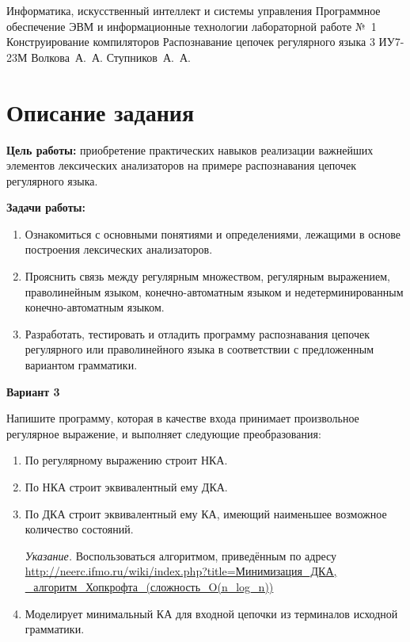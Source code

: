 \documentclass{bmstu-gost-7-32}
\begin{document}
\makereporttitle
	{Информатика, искусственный интеллект и системы управления} %
	{Программное обеспечение ЭВМ и информационные технологии} %
	{лабораторной работе №~1} %
	{Конструирование компиляторов} %
	{Распознавание цепочек регулярного языка} %
	{3} %
	{ИУ7-23М} %
	{Волкова~А.~А.} %
	{Ступников~А.~А.} %

\section*{Описание задания}

\textbf{Цель работы:} приобретение практических навыков реализации важнейших элементов лексических анализаторов на примере распознавания цепочек регулярного языка.

\textbf{Задачи работы:}
\begin{enumerate}
	\item Ознакомиться с основными понятиями и определениями, лежащими в основе построения лексических анализаторов.
	\item Прояснить связь между регулярным множеством, регулярным выражением, праволинейным языком, конечно-автоматным языком и недетерминированным конечно-автоматным языком.
	\item Разработать, тестировать и отладить программу распознавания цепочек регулярного или праволинейного языка в соответствии с предложенным вариантом грамматики.
\end{enumerate}

\textbf{Вариант 3}

Напишите программу, которая в качестве входа принимает произвольное регулярное выражение, и выполняет следующие преобразования:

\begin{enumerate}
	\item По регулярному выражению строит НКА.
	\item По НКА строит эквивалентный ему ДКА.
	\item По ДКА строит эквивалентный ему КА, имеющий наименьшее возможное количество состояний.

	\textit{Указание.} Воспользоваться алгоритмом, приведённым по адресу \href{http://neerc.ifmo.ru/wiki/index.php?title=\%D0\%9C\%D0\%B8\%D0\%BD\%D0\%B8\%D0\%BC\%D0\%B8\%D0\%B7\%D0\%B0\%D1\%86\%D0\%B8\%D1\%8F_\%D0\%94\%D0\%9A\%D0\%90,_\%D0\%B0\%D0\%BB\%D0\%B3\%D0\%BE\%D1\%80\%D0\%B8\%D1\%82\%D0\%BC_\%D0\%A5\%D0\%BE\%D0\%BF\%D0\%BA\%D1\%80\%D0\%BE\%D1\%84\%D1\%82\%D0\%B0_(\%D1\%81\%D0\%BB\%D0\%BE\%D0\%B6\%D0\%BD\%D0\%BE\%D1\%81\%D1\%82\%D1\%8C_O(n_log_n))}{http://neerc.ifmo.ru/wiki/index.php?title=Минимизация\_ДКА,\\\_алгоритм\_Хопкрофта\_(сложность\_O(n\_log\_n))}

	\item Моделирует минимальный КА для входной цепочки из терминалов исходной грамматики.
\end{enumerate}
\end{document}
